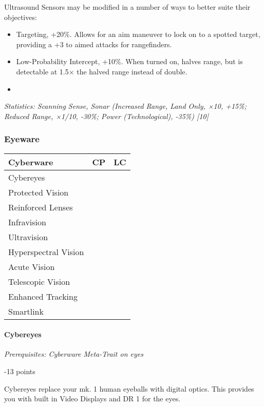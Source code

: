 \begin{multicols*}{3}
	Ultrasound Sensors may be modified in a number of ways to better suite their objectives:
	\begin{itemize}
		\item Targeting, +20\%. Allows for an aim maneuver to lock on to a spotted target, providing a +3 to aimed attacks for rangefinders.
		\item Low-Probability Intercept, +10\%. When turned on, halves range, but is detectable at 1.5× the halved range instead of double.
		\item 
	\end{itemize}
	
	\textit{\textcolor{OliveGreen}{Statistics: Scanning Sense, Sonar (Increased Range, Land Only, ×10, +15\%; Reduced Range, ×1/10, -30\%; Power (Technological), -35\%) [10]}}
	
	\subsubsection{Eyeware}
	
	\begin{center}
		\begin{tabularx}{0.32\textwidth}{|X|c|c|}
			\hline
			Cyberware & CP & LC\\
			\hline
			\hline
			Cybereyes & & \\
			\hline
			Protected Vision & & \\
			Reinforced Lenses & & \\
			Infravision & & \\
			Ultravision & & \\
			Hyperspectral Vision & & \\
			Acute Vision & & \\
			Telescopic Vision & & \\
			Enhanced Tracking & & \\
			Smartlink & & \\
			\hline
		\end{tabularx}
	\end{center}
	
	\paragraph{Cybereyes}
	\textit{Prerequisites: Cyberware Meta-Trait on eyes}
	\begin{flushright}
		-13 points
	\end{flushright}
	
	Cybereyes replace your mk. 1 human eyeballs with digital optics. This provides you with built in Video Displays and DR 1 for the eyes.
	

\end{multicols*}
